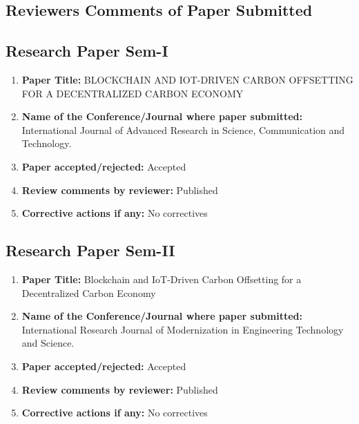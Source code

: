 \documentclass[oneside,a4paper,12pt]{book}
\begin{document}
\begin{appendices}
\chapter{Reviewers Comments of Paper Submitted}

\section{Research Paper Sem-I}

\begin{enumerate}
    \item \textbf{Paper Title:} BLOCKCHAIN AND IOT-DRIVEN CARBON OFFSETTING FOR A DECENTRALIZED CARBON ECONOMY
    
    \item \textbf{Name of the Conference/Journal where paper submitted:} International Journal of Advanced Research in Science, Communication and Technology.
    
    \item \textbf{Paper accepted/rejected:} Accepted
    
    \item \textbf{Review comments by reviewer:} Published
    
    \item \textbf{Corrective actions if any:} No correctives
\end{enumerate}


\section{Research Paper Sem-II}

\begin{enumerate}
    \item \textbf{Paper Title:} Blockchain and IoT-Driven Carbon Offsetting for a Decentralized Carbon Economy
    
    \item \textbf{Name of the Conference/Journal where paper submitted:} International Research Journal of Modernization in Engineering Technology and Science.
    
    \item \textbf{Paper accepted/rejected:} Accepted
    
    \item \textbf{Review comments by reviewer:} Published
    
    \item \textbf{Corrective actions if any:} No correctives
\end{enumerate}




\end{appendices}
\end{document}
